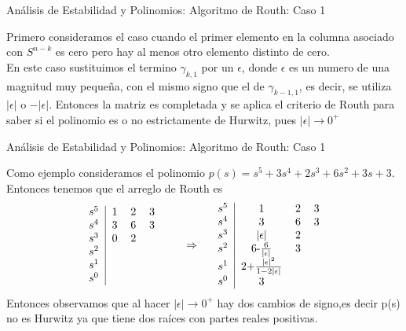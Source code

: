 \documentclass{beamer}
\begin{document}
\begin{frame}{Análisis de Estabilidad y Polinomios: Algoritmo de Routh: Caso 1}
\begin{justify}

 Primero consideramos el caso cuando el primer elemento en la columna asociado con $S^{n-k}$ es cero pero hay al menos otro elemento distinto de cero.\\

 En este caso sustituimos el termino $\gamma_{k,1}$ por un $\epsilon$, donde $\epsilon$ es un numero de una magnitud muy pequeña, con el mismo signo que el de $\gamma_{k-1,1}$, es decir, se utiliza $\left | \epsilon \right |$ o $-\left | \epsilon \right |$. Entonces la matriz es completada y se aplica el criterio de Routh para saber si el polinomio es o no estrictamente de Hurwitz, pues $\left | \epsilon \right | \rightarrow 0^+$ 


\end{justify}
\end{frame}

\begin{frame}{Análisis de Estabilidad y Polinomios: Algoritmo de Routh: Caso 1}
\begin{justify}

 Como ejemplo consideramos el polinomio $p(s)=s^5+3s^4+2s^3+6s^2+3s+3$. Entonces tenemos que el arreglo de Routh es
\[
\begin{tabular}{c|ccccc}
$s^5$ & 1 & 2 & 3 \\ 
$s^4$ & 3 & 6 & 3 \\
$s^3$ & 0 & 2 \\
$s^2$ \\
$s^1$ \\
$s^0$ 

\end{tabular}
\qquad
\Rightarrow 
\quad
\begin{tabular}{c|ccccc}
$s^5$ & 1 & 2 & 3 \\ 
$s^4$ & 3 & 6 & 3 \\
$s^3$ & $\left | \epsilon \right |$ & 2 \\
$s^2$ & 6-$\frac{6}{\left | \epsilon \right |}$ & 3\\
$s^1$ & 2+$\frac{\left | \epsilon \right |^2}{1-2\left | \epsilon \right |}$  \\
$s^0$ & 3
\end{tabular}
\]
Entonces observamos que al hacer $\left | \epsilon \right | \rightarrow 0^+$  hay dos cambios de signo,es decir p(s) no es Hurwitz ya que tiene dos raíces con partes reales positivas.

\end{justify}
\end{frame}
\end{document}
